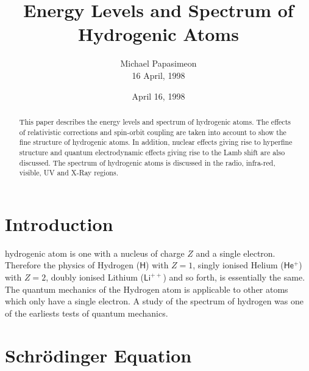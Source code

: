 \documentclass[a4paper]{IEEEtran}
\title{Energy Levels and Spectrum of Hydrogenic Atoms}
\author{ Michael Papasimeon\\ 16 April, 1998} %
\date{April 16, 1998}
\begin{document}
\maketitle
\thispagestyle{plain} 

\begin{abstract}
	This paper describes the energy levels and spectrum of hydrogenic atoms.
	The effects of relativistic corrections and spin-orbit coupling are taken
	into account to show the fine structure of hydrogenic atoms. In addition,
	nuclear effects giving rise to hyperfine structure and quantum 
	electrodynamic effects giving rise to the Lamb shift are also discussed.
	The spectrum of hydrogenic atoms is discussed in the radio, infra-red,
	visible, UV and X-Ray regions.
\end{abstract}




\section{Introduction}
     hydrogenic atom is one with a nucleus of charge $Z$ and a single electron. 
    Therefore the physics of Hydrogen ($\mathsf{H}$) with $Z = 1$, singly ionised 
    Helium ($\mathsf{He^+}$) with $Z = 2$, doubly ionised Lithium ($\mathsf{Li^{++}}$) 
    and so forth, is essentially the same. The quantum mechanics of the Hydrogen atom 
    is applicable to other atoms which only have a single electron. A study of the
    spectrum of hydrogen was one of the earliests tests of quantum mechanics.

\section{Schr\"odinger Equation}
\end{document}

